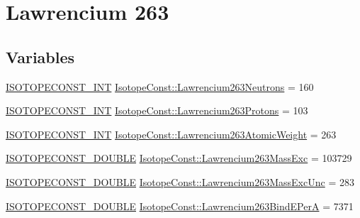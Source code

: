 \hypertarget{group___isotope_const-_lawrencium-_lr263}{}\section{Lawrencium 263}
\label{group___isotope_const-_lawrencium-_lr263}
\subsection*{Variables}
\begin{DoxyCompactItemize}
\item 
\mbox{\hyperlink{group___isotope_const-_macros_ga5f18360b3e99483a35c32d789e62621c}{I\+S\+O\+T\+O\+P\+E\+C\+O\+N\+S\+T\+\_\+\+I\+NT}} \mbox{\hyperlink{group___isotope_const-_lawrencium-_lr263_ga7e3b49530022d4f16aa256f9fe3d3612}{Isotope\+Const\+::\+Lawrencium263\+Neutrons}} = 160
\item 
\mbox{\hyperlink{group___isotope_const-_macros_ga5f18360b3e99483a35c32d789e62621c}{I\+S\+O\+T\+O\+P\+E\+C\+O\+N\+S\+T\+\_\+\+I\+NT}} \mbox{\hyperlink{group___isotope_const-_lawrencium-_lr263_ga719c5f08124d3b2c4f6a0863051d2639}{Isotope\+Const\+::\+Lawrencium263\+Protons}} = 103
\item 
\mbox{\hyperlink{group___isotope_const-_macros_ga5f18360b3e99483a35c32d789e62621c}{I\+S\+O\+T\+O\+P\+E\+C\+O\+N\+S\+T\+\_\+\+I\+NT}} \mbox{\hyperlink{group___isotope_const-_lawrencium-_lr263_ga3d185af501bdbd88062f19cad701f5cc}{Isotope\+Const\+::\+Lawrencium263\+Atomic\+Weight}} = 263
\item 
\mbox{\hyperlink{group___isotope_const-_macros_ga8f45a7272ce02c0b4c65c44636ed719a}{I\+S\+O\+T\+O\+P\+E\+C\+O\+N\+S\+T\+\_\+\+D\+O\+U\+B\+LE}} \mbox{\hyperlink{group___isotope_const-_lawrencium-_lr263_ga9df3ee86a649fbf5eb73134ff4b00cc0}{Isotope\+Const\+::\+Lawrencium263\+Mass\+Exc}} = 103729
\item 
\mbox{\hyperlink{group___isotope_const-_macros_ga8f45a7272ce02c0b4c65c44636ed719a}{I\+S\+O\+T\+O\+P\+E\+C\+O\+N\+S\+T\+\_\+\+D\+O\+U\+B\+LE}} \mbox{\hyperlink{group___isotope_const-_lawrencium-_lr263_ga59bc6be5934903f94f92062012af6394}{Isotope\+Const\+::\+Lawrencium263\+Mass\+Exc\+Unc}} = 283
\item 
\mbox{\hyperlink{group___isotope_const-_macros_ga8f45a7272ce02c0b4c65c44636ed719a}{I\+S\+O\+T\+O\+P\+E\+C\+O\+N\+S\+T\+\_\+\+D\+O\+U\+B\+LE}} \mbox{\hyperlink{group___isotope_const-_lawrencium-_lr263_ga2daf464048a747f064bea4e6f6f49274}{Isotope\+Const\+::\+Lawrencium263\+Bind\+E\+PerA}} = 7371
\item 

\end{DoxyCompactItemize}
